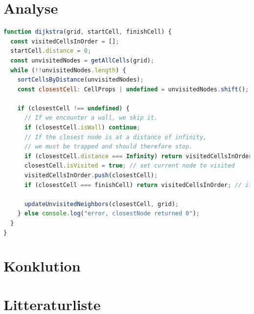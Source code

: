 \documentclass[12pt]{article}
\begin{document}
\section{Analyse}

\begin{lstlisting}[language=JavaScript, caption=Dijkstra's Algoritme]
  function dijkstra(grid, startCell, finishCell) {
  const visitedCellsInOrder = [];
  startCell.distance = 0;
  const unvisitedNodes = getAllCells(grid);
  while (!!unvisitedNodes.length) {
    sortCellsByDistance(unvisitedNodes);
    const closestCell: CellProps | undefined = unvisitedNodes.shift();

    if (closestCell !== undefined) {
      // If we encounter a wall, we skip it.
      if (closestCell.isWall) continue;
      // If the closest node is at a distance of infinity,
      // we must be trapped and should therefore stop.
      if (closestCell.distance === Infinity) return visitedCellsInOrder;
      closestCell.isVisited = true; // set current node to visited
      visitedCellsInOrder.push(closestCell);
      if (closestCell === finishCell) return visitedCellsInOrder; // if reached finishcell

      updateUnvisitedNeighbors(closestCell, grid);
    } else console.log("error, closestNode returned 0");
  }
}
\end{lstlisting}
\section{Konklution}

\section{Litteraturliste}

\newpage
\end{document}
